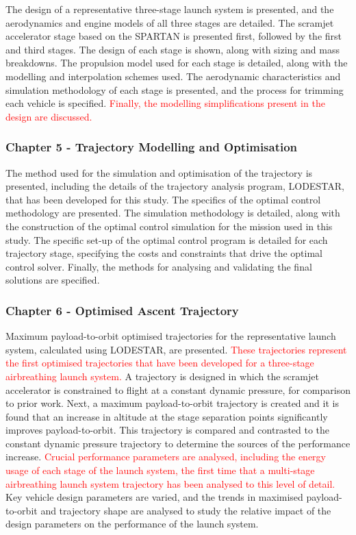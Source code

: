       The design of a representative three-stage launch system is presented, and the aerodynamics and engine models of all three stages are detailed. The scramjet accelerator stage based on the SPARTAN is presented first, followed by the first and third stages. The design of each stage is shown, along with sizing and mass breakdowns. The propulsion model used for each stage is detailed, along with the modelling and interpolation schemes used. The aerodynamic characteristics and simulation methodology of each stage is presented, and the process for trimming each vehicle is specified. \textcolor{red}{Finally, the modelling simplifications present in the design are discussed.}
      
      
      \subsubsection*{Chapter 5 - Trajectory Modelling and Optimisation}
      
      The method used for the simulation and optimisation of the trajectory is presented, including the details of the trajectory analysis program, LODESTAR, that has been developed for this study. The specifics of the optimal control methodology are presented. The simulation methodology is detailed, along with the construction of the optimal control simulation for the mission used in this study. The specific set-up of the optimal control program is detailed for each trajectory stage, specifying the costs and constraints that drive the optimal control solver. Finally, the methods for analysing and validating the final solutions are specified.
      
      \subsubsection*{Chapter 6 - Optimised Ascent Trajectory}
      
Maximum payload-to-orbit optimised trajectories for the representative launch system, calculated using LODESTAR, are presented. \textcolor{red}{These trajectories represent the first optimised trajectories that have been developed for a three-stage airbreathing launch system.} A trajectory is designed in which the scramjet accelerator is constrained to flight at a constant dynamic pressure, for comparison to prior work. Next, a maximum payload-to-orbit trajectory is created and it is found that an increase in altitude at the stage separation points significantly improves payload-to-orbit.
 This trajectory is compared and contrasted to the constant dynamic pressure trajectory to determine the sources of the performance increase. \textcolor{red}{Crucial performance parameters are analysed, including the energy usage of each stage of the launch system, the first time that a multi-stage airbreathing launch system trajectory has been analysed to this level of detail.} 
 Key vehicle design parameters are varied, and the trends in maximised payload-to-orbit and trajectory shape are analysed to study the relative impact of the design parameters on the performance of the launch system. 
 
